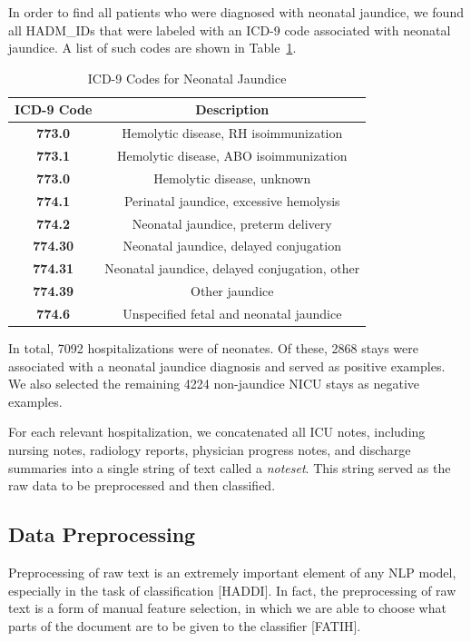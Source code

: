 \documentclass[conference]{IEEEtran}
\begin{document}
In order to find all patients who were diagnosed with neonatal jaundice, we found all HADM\_IDs that were labeled with an ICD-9 code associated with neonatal jaundice. A list of such codes are shown in Table~\ref{tab1}. 
\begin{table}[htbp]
\caption{ICD-9 Codes for Neonatal Jaundice}
\begin{center}
\begin{tabular}{cc}
\textbf{ICD-9 Code}&\textbf{Description} \\
\hline
\textbf{773.0} & Hemolytic disease, RH isoimmunization \\
\textbf{773.1} & Hemolytic disease, ABO isoimmunization \\
\textbf{773.0} & Hemolytic disease, unknown \\
\textbf{774.1} & Perinatal jaundice, excessive hemolysis \\
\textbf{774.2} & Neonatal jaundice, preterm delivery \\
\textbf{774.30} & Neonatal jaundice, delayed conjugation \\
\textbf{774.31} &  Neonatal jaundice, delayed conjugation, other \\
\textbf{774.39} & Other jaundice \\
\textbf{774.6} & Unspecified fetal and neonatal jaundice \\
\end{tabular}
\label{tab1}
\end{center}
\end{table}
In total, 7092 hospitalizations were of neonates. Of these, 2868 stays were associated with a neonatal jaundice diagnosis and served as positive examples. We also selected the remaining 4224 non-jaundice NICU stays as negative examples.

For each relevant hospitalization, we concatenated all ICU notes, including nursing notes, radiology reports, physician progress notes, and discharge summaries into a single string of text called a \textit{noteset}. This string served as the raw data to be preprocessed and then classified. 
\subsection{Data Preprocessing}\label{AA}
Preprocessing of raw text is an extremely important element of any NLP model, especially in the task of classification [HADDI]. In fact, the preprocessing of raw text is a form of manual feature selection, in which we are able to choose what parts of the document are to be given to the classifier [FATIH].
\end{document}
